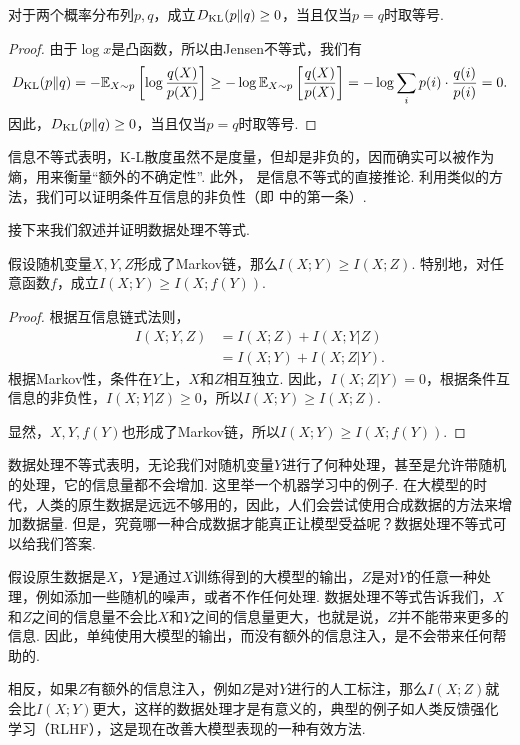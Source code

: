 \begin{theorem}[信息不等式]\label{thm:information-inequality}
    对于两个概率分布列$p,q$，成立$D_{\mathrm{KL}}(p\Vert q)\geq0$，当且仅当$p=q$时取等号.
\end{theorem}
\begin{proof}
    由于$\log x$是凸函数，所以由Jensen不等式，我们有
    \[D_{\mathrm{KL}}(p\Vert q)=-\mathbb{E}_{X\sim p}\left[\log\frac{q(X)}{p(X)}\right]\geq-\log \mathbb{E}_{X\sim p}\left[\frac{q(X)}{p(X)}\right]=-\log\sum_ip(i)\cdot\frac{q(i)}{p(i)}=0.\]
    因此，$D_{\mathrm{KL}}(p\Vert q)\geq0$，当且仅当$p=q$时取等号.
\end{proof}

信息不等式表明，K-L散度虽然不是度量，但却是非负的，因而确实可以被作为熵，用来衡量“额外的不确定性”. 此外， 是信息不等式的直接推论. 利用类似的方法，我们可以证明条件互信息的非负性（即 中的第一条）.

接下来我们叙述并证明数据处理不等式.
\begin{theorem}[数据处理不等式]\label{thm:data-processing-inequality}
    假设随机变量$X,Y,Z$形成了Markov链，那么$I(X;Y)\geq I(X;Z)$. 特别地，对任意函数$f$，成立$I(X;Y)\geq I(X;f(Y))$.
\end{theorem}
\begin{proof}
根据互信息链式法则，
    \begin{align*}
        I(X;Y,Z)&=I(X;Z)+I(X;Y|Z)\\
        &=I(X;Y)+I(X;Z|Y).
    \end{align*}
根据Markov性，条件在$Y$上，$X$和$Z$相互独立. 因此，$I(X;Z|Y)=0$，根据条件互信息的非负性，$I(X;Y|Z)\geq0$，所以$I(X;Y)\geq I(X;Z)$.

显然，$X,Y,f(Y)$也形成了Markov链，所以$I(X;Y)\geq I(X;f(Y))$.
\end{proof}

数据处理不等式表明，无论我们对随机变量$Y$进行了何种处理，甚至是允许带随机的处理，它的信息量都不会增加. 这里举一个机器学习中的例子. 在大模型的时代，人类的原生数据是远远不够用的，因此，人们会尝试使用合成数据的方法来增加数据量. 但是，究竟哪一种合成数据才能真正让模型受益呢？数据处理不等式可以给我们答案. 

假设原生数据是$X$，$Y$是通过$X$训练得到的大模型的输出，$Z$是对$Y$的任意一种处理，例如添加一些随机的噪声，或者不作任何处理. 数据处理不等式告诉我们，$X$和$Z$之间的信息量不会比$X$和$Y$之间的信息量更大，也就是说，$Z$并不能带来更多的信息. 因此，单纯使用大模型的输出，而没有额外的信息注入，是不会带来任何帮助的.

相反，如果$Z$有额外的信息注入，例如$Z$是对$Y$进行的人工标注，那么$I(X;Z)$就会比$I(X;Y)$更大，这样的数据处理才是有意义的，典型的例子如人类反馈强化学习（RLHF），这是现在改善大模型表现的一种有效方法.

